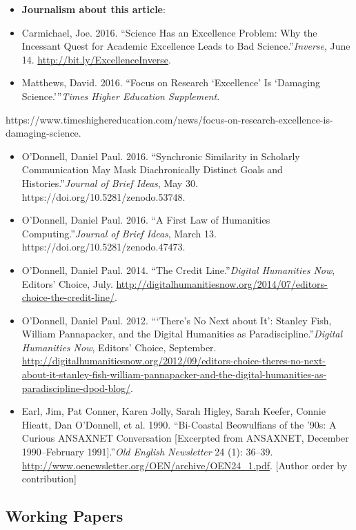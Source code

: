 \documentclass[12pt]{article}
\begin{document}
\begin{itemize}
  \item \textbf{Journalism about this article}:
  \item Carmichael, Joe. 2016. “Science Has an Excellence Problem: Why the Incessant Quest for Academic Excellence Leads to Bad Science.”\textit{Inverse}, June 14. \url{http://bit.ly/ExcellenceInverse}.
  \item Matthews, David. 2016. “Focus on Research ‘Excellence’ Is ‘Damaging Science.’”\textit{Times Higher Education Supplement}.
\end{itemize}
    https://www.timeshighereducation.com/news/focus-on-research-excellence-is-damaging-science.
\begin{itemize}
  \item O’Donnell, Daniel Paul. 2016. “Synchronic Similarity in Scholarly Communication May Mask Diachronically Distinct Goals and Histories.”\textit{Journal of Brief Ideas}, May 30. https://doi.org/10.5281/zenodo.53748.
  \item O’Donnell, Daniel Paul. 2016. “A First Law of Humanities Computing.”\textit{Journal of Brief Ideas}, March 13. https://doi.org/10.5281/zenodo.47473.
  \item O’Donnell, Daniel Paul. 2014. “The Credit Line.”\textit{Digital Humanities Now}, Editors’ Choice, July. \url{http://digitalhumanitiesnow.org/2014/07/editors-choice-the-credit-line/}.
  \item O’Donnell, Daniel Paul. 2012. “‘There’s No Next about It’: Stanley Fish, William Pannapacker, and the Digital Humanities as Paradiscipline.”\textit{Digital Humanities Now}, Editors’ Choice, September. \url{http://digitalhumanitiesnow.org/2012/09/editors-choice-theres-no-next-about-it-stanley-fish-william-pannapacker-and-the-digital-humanities-as-paradiscipline-dpod-blog/}.
  \item Earl, Jim, Pat Conner, Karen Jolly, Sarah Higley, Sarah Keefer, Connie Hieatt, Dan O’Donnell\*, et al. 1990. “Bi-Coastal Beowulfians of the ’90s: A Curious ANSAXNET Conversation [Excerpted from ANSAXNET, December 1990–February 1991].”\textit{Old English Newsletter} 24 (1): 36–39. \url{http://www.oenewsletter.org/OEN/archive/OEN24_1.pdf}. [Author order by contribution]
\end{itemize}


\subsection*{Working Papers}
\end{document}

